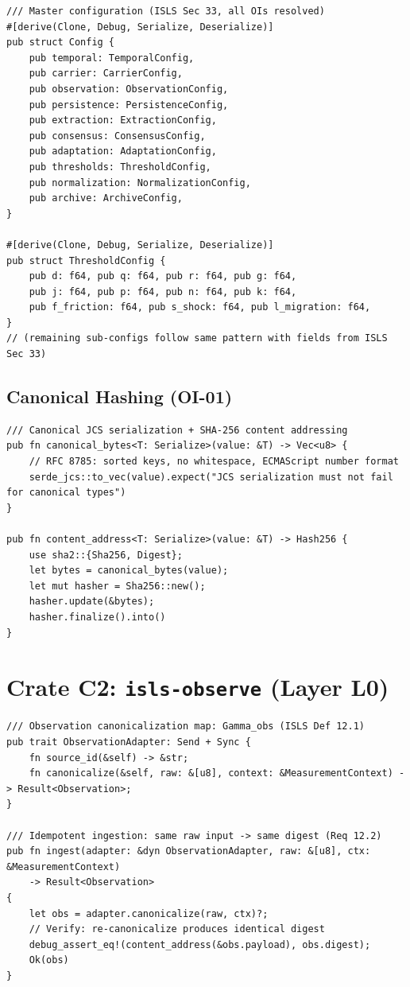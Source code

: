 \documentclass[10pt,a4paper]{article}
\theoremstyle{definition}\newtheorem{definition}{Def}[section]
\theoremstyle{plain}\newtheorem{theorem}{Thm}[section]
\newcommand{\crate}[1]{\texttt{\small\color{rustborder!80!black}#1}}
\begin{document}
\begin{lstlisting}[style=rust]
/// Master configuration (ISLS Sec 33, all OIs resolved)
#[derive(Clone, Debug, Serialize, Deserialize)]
pub struct Config {
    pub temporal: TemporalConfig,
    pub carrier: CarrierConfig,
    pub observation: ObservationConfig,
    pub persistence: PersistenceConfig,
    pub extraction: ExtractionConfig,
    pub consensus: ConsensusConfig,
    pub adaptation: AdaptationConfig,
    pub thresholds: ThresholdConfig,
    pub normalization: NormalizationConfig,
    pub archive: ArchiveConfig,
}

#[derive(Clone, Debug, Serialize, Deserialize)]
pub struct ThresholdConfig {
    pub d: f64, pub q: f64, pub r: f64, pub g: f64,
    pub j: f64, pub p: f64, pub n: f64, pub k: f64,
    pub f_friction: f64, pub s_shock: f64, pub l_migration: f64,
}
// (remaining sub-configs follow same pattern with fields from ISLS Sec 33)
\end{lstlisting}

\subsection{Canonical Hashing (OI-01)}

\begin{lstlisting}[style=rust]
/// Canonical JCS serialization + SHA-256 content addressing
pub fn canonical_bytes<T: Serialize>(value: &T) -> Vec<u8> {
    // RFC 8785: sorted keys, no whitespace, ECMAScript number format
    serde_jcs::to_vec(value).expect("JCS serialization must not fail for canonical types")
}

pub fn content_address<T: Serialize>(value: &T) -> Hash256 {
    use sha2::{Sha256, Digest};
    let bytes = canonical_bytes(value);
    let mut hasher = Sha256::new();
    hasher.update(&bytes);
    hasher.finalize().into()
}
\end{lstlisting}

\section{Crate C2: \crate{isls-observe} (Layer L0)}
\label{sec:c2}

\begin{lstlisting}[style=rust]
/// Observation canonicalization map: Gamma_obs (ISLS Def 12.1)
pub trait ObservationAdapter: Send + Sync {
    fn source_id(&self) -> &str;
    fn canonicalize(&self, raw: &[u8], context: &MeasurementContext) -> Result<Observation>;
}

/// Idempotent ingestion: same raw input -> same digest (Req 12.2)
pub fn ingest(adapter: &dyn ObservationAdapter, raw: &[u8], ctx: &MeasurementContext)
    -> Result<Observation>
{
    let obs = adapter.canonicalize(raw, ctx)?;
    // Verify: re-canonicalize produces identical digest
    debug_assert_eq!(content_address(&obs.payload), obs.digest);
    Ok(obs)
}
\end{lstlisting}
\end{document}
